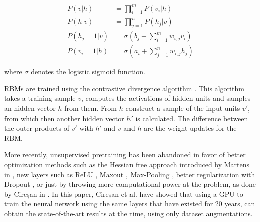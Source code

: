\begin{align*}
	P(v|h) &= \prod_{i=1}^m P(v_i|h) \\
	P(h|v) &= \prod_{j=1}^n P(h_j|v) \\
	P(h_j=1|v) &= \sigma \left(b_j + \sum_{i=1}^m w_{i,j} v_i \right) \\ 
	P(v_i=1|h) &= \sigma \left(a_i + \sum_{j=1}^n w_{i,j} h_j \right)
\end{align*}

where $ \sigma $ denotes the logistic sigmoid function.

RBMs are trained using the contrastive divergence algorithm \cite{hinton2002training}. This algorithm takes a training sample $ v $, computes the activations of hidden units and samples an hidden vector $h$ from them. From $h$ construct a sample of the input units $ v'$, from which then another hidden vector $ h' $ is calculated. The difference between the outer products of $ v' $ with $ h' $ and $ v $ and $ h $ are the weight updates for the RBM. 

More recently, unsupervised pretraining has been abandoned in favor of better optimization methods such as the Hessian free approach introduced by Martens in \cite{martens2010deep}, new layers such as ReLU \cite{nair2010rectified}, Maxout \cite{goodfellow2013maxout}, Max-Pooling \cite{scherer2010evaluation}, better regularization with Dropout \cite{hinton2012improving}, or just by throwing more computational power at the problem, as done by Cireșan in \cite{Cire_an_2010}. In this paper, Cireșan et al. have showed that using a GPU to train the neural network using the same layers that have existed for 20 years, can obtain the state-of-the-art results at the time, using only dataset augmentations. 